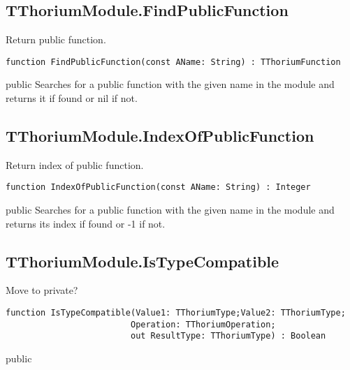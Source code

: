 \subsection{TThoriumModule.FindPublicFunction}
\label{thoriumcorepkg:thorium:tthoriummodule:findpublicfunction}
\begin{FPCList}
\Synopsis
Return public function.\Declaration 

\begin{verbatim}
function FindPublicFunction(const AName: String) : TThoriumFunction
\end{verbatim}
\Visibility
public
\Description
Searches for a public function with the given name in the module and returns it if found or nil if not.\end{FPCList}
\subsection{TThoriumModule.IndexOfPublicFunction}
\label{thoriumcorepkg:thorium:tthoriummodule:indexofpublicfunction}
\begin{FPCList}
\Synopsis
Return index of public function.\Declaration 

\begin{verbatim}
function IndexOfPublicFunction(const AName: String) : Integer
\end{verbatim}
\Visibility
public
\Description
Searches for a public function with the given name in the module and returns its index if found or -1 if not.\end{FPCList}
\subsection{TThoriumModule.IsTypeCompatible}
\label{thoriumcorepkg:thorium:tthoriummodule:istypecompatible}
\begin{FPCList}
\Synopsis
Move to private?\Declaration 

\begin{verbatim}
function IsTypeCompatible(Value1: TThoriumType;Value2: TThoriumType;
                         Operation: TThoriumOperation;
                         out ResultType: TThoriumType) : Boolean
\end{verbatim}
\Visibility
public
\end{FPCList}

